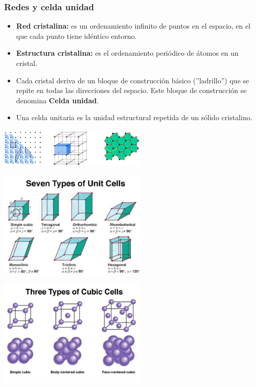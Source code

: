         \subsubsection{Redes y celda unidad}
            \begin{itemize}
                \item \textbf{Red cristalina:} es un ordenamiento infinito de puntos en el espacio, en el que cada punto tiene idéntico entorno.
                \item \textbf{Estructura cristalina:} es el ordenamiento periódico de átomos en un cristal.
                \item Cada cristal deriva de un bloque de construcción básico (''ladrillo'') que se repite en todas las direcciones del espacio. Este bloque de construcción se denomina \textbf{Celda unidad}.
                \item Una celda unitaria es la unidad estructural repetida de un sólido cristalino.
            \end{itemize}
            \saltoPag{}
            \begin{center} \includegraphics[width=7cm]{./imagenes/celdaUnitaria.png} \end{center}
            \begin{center} \includegraphics[width=7cm]{./imagenes/tiposDeCeldas.png} \end{center}
            \begin{center} \includegraphics[width=7cm]{./imagenes/tiposDeCeldasCubicas.png} \end{center}
